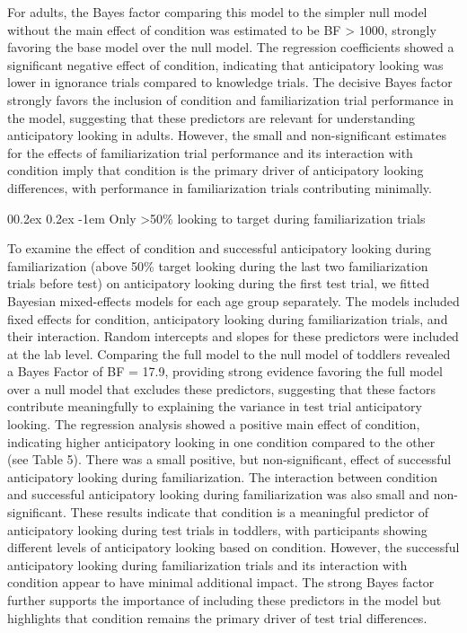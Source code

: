 \documentclass[
  man,floatsintext]{apa6}
\makeatletter
\let\oldparagraph\paragraph
\renewcommand{\paragraph}{
    \@ifstar
      \xxxParagraphStar
      \xxxParagraphNoStar
  }
\newcommand{\xxxParagraphStar}[1]{\oldparagraph*{#1}\mbox{}}
\newcommand{\xxxParagraphNoStar}[1]{\oldparagraph{#1}\mbox{}}
\renewcommand{\paragraph}{\@startsection{paragraph}{4}{\parindent}%
  {0\baselineskip \@plus 0.2ex \@minus 0.2ex}%
  {-1em}%
  {\normalfont\normalsize\bfseries\itshape\typesectitle}}
\makeatother
\begin{document}
For adults, the Bayes factor comparing this model to the simpler null model without the main effect of condition was estimated to be BF \textgreater{} 1000, strongly favoring the base model over the null model. The regression coefficients showed a significant negative effect of condition, indicating that anticipatory looking was lower in ignorance trials compared to knowledge trials. The decisive Bayes factor strongly favors the inclusion of condition and familiarization trial performance in the model, suggesting that these predictors are relevant for understanding anticipatory looking in adults. However, the small and non-significant estimates for the effects of familiarization trial performance and its interaction with condition imply that condition is the primary driver of anticipatory looking differences, with performance in familiarization trials contributing minimally.

\paragraph{Only \textgreater50\% looking to target during familiarization trials}\label{only-50-looking-to-target-during-familiarization-trials}

To examine the effect of condition and successful anticipatory looking during familiarization (above 50\% target looking during the last two familiarization trials before test) on anticipatory looking during the first test trial, we fitted Bayesian mixed-effects models for each age group separately. The models included fixed effects for condition, anticipatory looking during familiarization trials, and their interaction. Random intercepts and slopes for these predictors were included at the lab level. Comparing the full model to the null model of toddlers revealed a Bayes Factor of BF = 17.9, providing strong evidence favoring the full model over a null model that excludes these predictors, suggesting that these factors contribute meaningfully to explaining the variance in test trial anticipatory looking. The regression analysis showed a positive main effect of condition, indicating higher anticipatory looking in one condition compared to the other (see Table 5). There was a small positive, but non-significant, effect of successful anticipatory looking during familiarization. The interaction between condition and successful anticipatory looking during familiarization was also small and non-significant. These results indicate that condition is a meaningful predictor of anticipatory looking during test trials in toddlers, with participants showing different levels of anticipatory looking based on condition. However, the successful anticipatory looking during familiarization trials and its interaction with condition appear to have minimal additional impact. The strong Bayes factor further supports the importance of including these predictors in the model but highlights that condition remains the primary driver of test trial differences.
\end{document}
